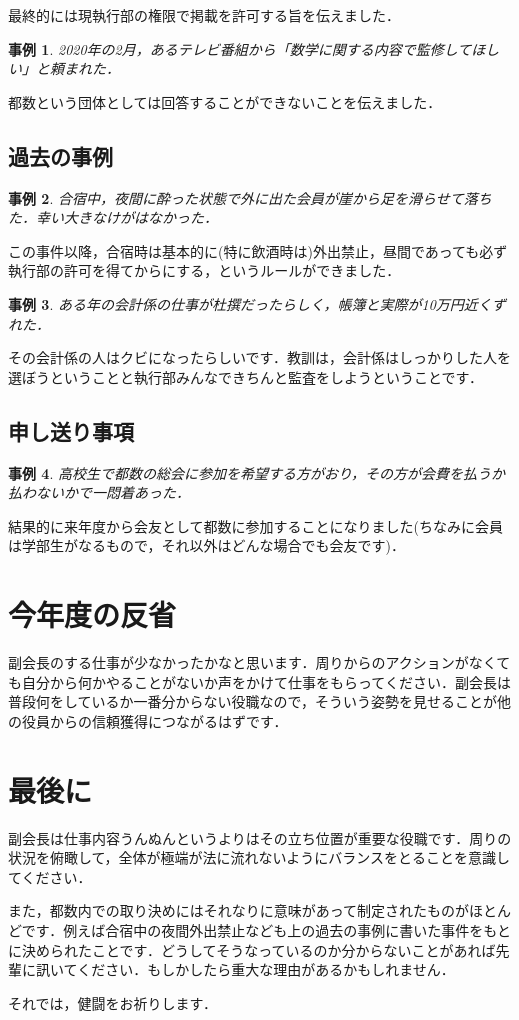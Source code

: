 \documentclass[uplatex]{jsarticle}
\newtheorem{case}{事例}
\begin{document}
最終的には現執行部の権限で掲載を許可する旨を伝えました．

\begin{case}
2020年の2月，あるテレビ番組から「数学に関する内容で監修してほしい」と頼まれた．
\end{case}

都数という団体としては回答することができないことを伝えました．

\subsection{過去の事例}
\begin{case}
合宿中，夜間に酔った状態で外に出た会員が崖から足を滑らせて落ちた．幸い大きなけがはなかった．
\end{case}

この事件以降，合宿時は基本的に(特に飲酒時は)外出禁止，昼間であっても必ず執行部の許可を得てからにする，というルールができました．

\begin{case}
ある年の会計係の仕事が杜撰だったらしく，帳簿と実際が10万円近くずれた．
\end{case}

その会計係の人はクビになったらしいです．教訓は，会計係はしっかりした人を選ぼうということと執行部みんなできちんと監査をしようということです．

\subsection{申し送り事項}
\begin{case}
高校生で都数の総会に参加を希望する方がおり，その方が会費を払うか払わないかで一悶着あった．
\end{case}

結果的に来年度から会友として都数に参加することになりました(ちなみに会員は学部生がなるもので，それ以外はどんな場合でも会友です)．

\section{今年度の反省}
副会長のする仕事が少なかったかなと思います．周りからのアクションがなくても自分から何かやることがないか声をかけて仕事をもらってください．副会長は普段何をしているか一番分からない役職なので，そういう姿勢を見せることが他の役員からの信頼獲得につながるはずです．

\section{最後に}
副会長は仕事内容うんぬんというよりはその立ち位置が重要な役職です．周りの状況を俯瞰して，全体が極端が法に流れないようにバランスをとることを意識してください．

また，都数内での取り決めにはそれなりに意味があって制定されたものがほとんどです．例えば合宿中の夜間外出禁止なども上の過去の事例に書いた事件をもとに決められたことです．どうしてそうなっているのか分からないことがあれば先輩に訊いてください．もしかしたら重大な理由があるかもしれません．

それでは，健闘をお祈りします．
\end{document}
